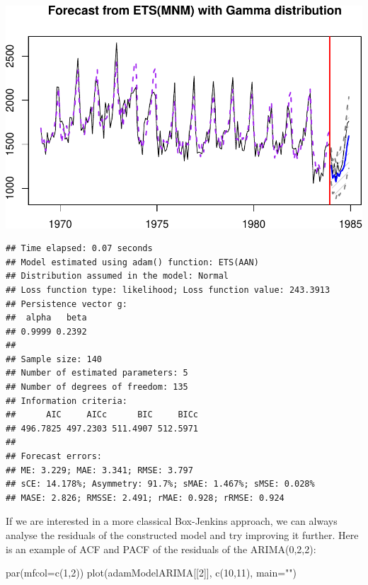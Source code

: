 \documentclass[
]{book}
\newenvironment{Shaded}{\begin{snugshade}}{\end{snugshade}}
\newcommand{\AttributeTok}[1]{\textcolor[rgb]{0.77,0.63,0.00}{#1}}
\newcommand{\DecValTok}[1]{\textcolor[rgb]{0.00,0.00,0.81}{#1}}
\newcommand{\FunctionTok}[1]{\textcolor[rgb]{0.00,0.00,0.00}{#1}}
\newcommand{\NormalTok}[1]{#1}
\newcommand{\StringTok}[1]{\textcolor[rgb]{0.31,0.60,0.02}{#1}}
\theoremstyle{definition}
\theoremstyle{definition}
\theoremstyle{definition}
\theoremstyle{definition}
\theoremstyle{remark}
\begin{document}
\includegraphics{adam_files/figure-latex/unnamed-chunk-67-1.pdf}

\begin{verbatim}
## Time elapsed: 0.07 seconds
## Model estimated using adam() function: ETS(AAN)
## Distribution assumed in the model: Normal
## Loss function type: likelihood; Loss function value: 243.3913
## Persistence vector g:
##  alpha   beta 
## 0.9999 0.2392 
## 
## Sample size: 140
## Number of estimated parameters: 5
## Number of degrees of freedom: 135
## Information criteria:
##      AIC     AICc      BIC     BICc 
## 496.7825 497.2303 511.4907 512.5971 
## 
## Forecast errors:
## ME: 3.229; MAE: 3.341; RMSE: 3.797
## sCE: 14.178%; Asymmetry: 91.7%; sMAE: 1.467%; sMSE: 0.028%
## MASE: 2.826; RMSSE: 2.491; rMAE: 0.928; rRMSE: 0.924
\end{verbatim}

If we are interested in a more classical Box-Jenkins approach, we can always analyse the residuals of the constructed model and try improving it further. Here is an example of ACF and PACF of the residuals of the ARIMA(0,2,2):

\begin{Shaded}
\begin{Highlighting}[]
\FunctionTok{par}\NormalTok{(}\AttributeTok{mfcol=}\FunctionTok{c}\NormalTok{(}\DecValTok{1}\NormalTok{,}\DecValTok{2}\NormalTok{))}
\FunctionTok{plot}\NormalTok{(adamModelARIMA[[}\DecValTok{2}\NormalTok{]], }\FunctionTok{c}\NormalTok{(}\DecValTok{10}\NormalTok{,}\DecValTok{11}\NormalTok{), }\AttributeTok{main=}\StringTok{""}\NormalTok{)}
\end{Highlighting}
\end{Shaded}
\end{document}
